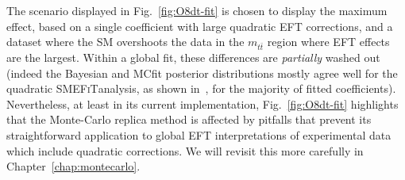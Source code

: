\documentclass[withindex,glossary]{cam-thesis}
\newcommand{\smefit}{\textsc{SMEFiT}}
\begin{document}
The scenario displayed in Fig.~\ref{fig:O8dt-fit} is chosen to display the maximum effect,
based on a single coefficient with large quadratic EFT corrections, and a dataset
where the SM overshoots the data in the $m_{t\bar{t}}$ region where EFT effects
are the largest.
%
Within a global fit, these differences are \textit{partially} washed out
(indeed the Bayesian and MCfit posterior distributions mostly agree well for
the quadratic \smefit analysis, as shown in~\cite{Giani:2023gfq}, for the majority
of fitted coefficients).
%
Nevertheless, at least in its current implementation, Fig.~\ref{fig:O8dt-fit} highlights
that the Monte-Carlo replica method is affected by pitfalls that
prevent its straightforward application to global EFT interpretations of experimental
data which include quadratic corrections. We will revisit this more carefully in Chapter~\ref{chap:montecarlo}.




\end{document}
